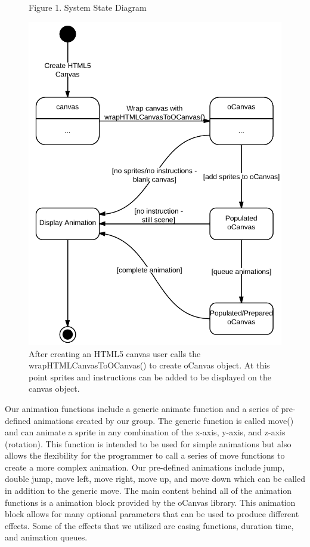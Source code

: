 \documentclass[12pt]{article}
\begin{document}
\begin{figure}
\caption{Figure 1. System State Diagram}
  \centering
    \includegraphics[scale=.3]{animation-statediagram.png}
    \caption*{After creating an HTML5 canvas user calls the wrapHTMLCanvasToOCanvas() to create oCanvas object. At this point sprites and instructions can be added to be displayed on the canvas object.}
\end{figure}
    

 \newpage
Our animation functions include a generic animate function and a series of pre-defined animations created by our group. The generic function is called move() and can animate a sprite in any combination of the x-axis, y-axis, and z-axis (rotation). This function is intended to be used for simple animations but also allows the flexibility for the programmer to call a series of move functions to create a more complex animation. Our pre-defined animations include jump, double jump, move left, move right, move up, and move down which can be called in addition to the generic move. The main content behind all of the animation functions is a animation block provided by the oCanvas library. This animation block allows for many optional parameters that can be used to produce different effects. Some of the effects that we utilized are easing functions, duration time, and animation queues. \\ 
\end{document}
